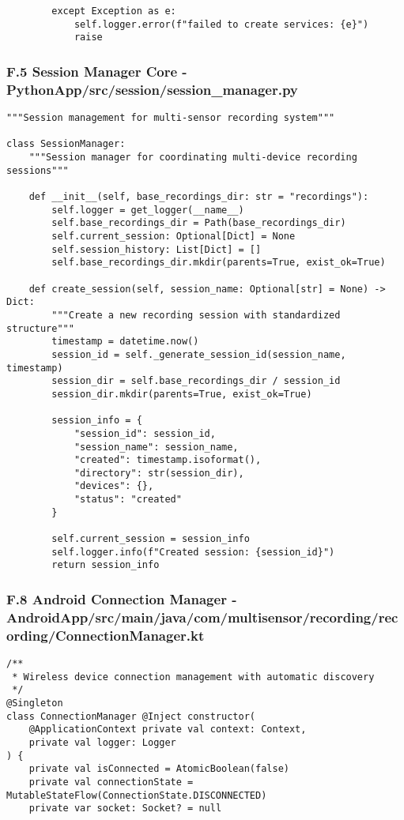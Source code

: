 \documentclass[12pt,a4paper]{article}
\begin{document}
{{\begin{verbatim}
        except Exception as e:
            self.logger.error(f"failed to create services: {e}")
            raise
\end{verbatim}

\subsubsection{F.5 Session Manager Core - PythonApp/src/session/session_manager.py}

\begin{verbatim}
"""Session management for multi-sensor recording system"""

class SessionManager:
    """Session manager for coordinating multi-device recording sessions"""
    
    def __init__(self, base_recordings_dir: str = "recordings"):
        self.logger = get_logger(__name__)
        self.base_recordings_dir = Path(base_recordings_dir)
        self.current_session: Optional[Dict] = None
        self.session_history: List[Dict] = []
        self.base_recordings_dir.mkdir(parents=True, exist_ok=True)
    
    def create_session(self, session_name: Optional[str] = None) -> Dict:
        """Create a new recording session with standardized structure"""
        timestamp = datetime.now()
        session_id = self._generate_session_id(session_name, timestamp)
        session_dir = self.base_recordings_dir / session_id
        session_dir.mkdir(parents=True, exist_ok=True)
        
        session_info = {
            "session_id": session_id,
            "session_name": session_name,
            "created": timestamp.isoformat(),
            "directory": str(session_dir),
            "devices": {},
            "status": "created"
        }
        
        self.current_session = session_info
        self.logger.info(f"Created session: {session_id}")
        return session_info
\end{verbatim}

\subsubsection{F.8 Android Connection Manager - AndroidApp/src/main/java/com/multisensor/recording/recording/ConnectionManager.kt}

\begin{verbatim}
/**
 * Wireless device connection management with automatic discovery
 */
@Singleton
class ConnectionManager @Inject constructor(
    @ApplicationContext private val context: Context,
    private val logger: Logger
) {
    private val isConnected = AtomicBoolean(false)
    private val connectionState = MutableStateFlow(ConnectionState.DISCONNECTED)
    private var socket: Socket? = null
    

\end{verbatim}}}
\end{document}
